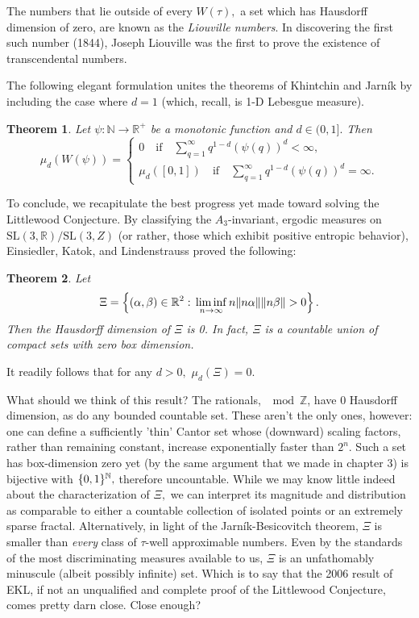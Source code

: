 \documentclass[12pt, letterpaper, oneside]{book}
\newcommand{\ga}{\ensuremath{\alpha}}
\newcommand{\gb}{\ensuremath{\beta}}
\newcommand{\gt}{\ensuremath{\tau}}
\newcommand{\R}{\mathbb{R}}
\newcommand{\N}{\mathbb{N}}
\newcommand{\Z}{\mathbb{Z}}
\DeclarePairedDelimiter{\norm}{\lVert}{\rVert}
\DeclarePairedDelimiter{\set}{\lbrace}{\rbrace}
\theoremstyle{plain}
\newtheorem{theorem}{Theorem}
\theoremstyle{definition}
\theoremstyle{remark}
\begin{document}
The numbers that lie outside of every $W(\gt),$ a set which has Hausdorff dimension of zero, are known as the \textit{Liouville numbers}. In discovering the first such number (1844), Joseph Liouville was the first to prove the existence of transcendental numbers.

The following elegant formulation unites the theorems of Khintchin and Jarn{\'i}k by including the case where $d = 1$ (which, recall, is 1-D Lebesgue measure). 

\begin{theorem}
Let $\psi: \N \to \R^+$ be a monotonic function and $d \in (0,1].$ Then
\[
\mu_d(W(\psi)) = 
\begin{cases}
0 \quad \mbox{if}\quad \sum_{q=1}^\infty q^{1-d}(\psi(q))^d < \infty,\\
\mu_d([0,1]) \quad \mbox{if} \quad \sum_{q=1}^\infty q^{1-d}(\psi(q))^d = \infty.
\end{cases}
\]
\end{theorem}

To conclude, we recapitulate the best progress yet made toward solving the Littlewood Conjecture. By classifying the $A_3$-invariant, ergodic measures on $\mbox{SL}(3,\R)/\mbox{SL}(3,Z)$ (or rather, those which exhibit positive entropic behavior), Einsiedler, Katok, and Lindenstrauss proved the following:

\begin{theorem}
Let 
\[
\Xi = \left \{ (\ga,\gb) \in \R^2:\,\liminf \limits_{n \to \infty} n\norm{n\ga}\norm{n\gb} > 0 \right \}.
\]
Then the Hausdorff dimension of $\Xi$ is 0. In fact, $\Xi$ is a countable union of compact sets with zero box dimension. 
\end{theorem}
It readily follows that for any $d > 0,$ $\mu_d(\Xi) = 0.$

What should we think of this result? The rationals, $\mod \Z$, have 0 Hausdorff dimension, as do any bounded countable set. These aren't the only ones, however: one can define a sufficiently 'thin' Cantor set whose (downward) scaling factors, rather than remaining constant, increase exponentially faster than $2^n.$ Such a set has box-dimension zero yet (by the same argument that we made in chapter 3) is bijective with $\set{0,1}^\N,$ therefore uncountable. While we may know little indeed about the characterization of $\Xi,$ we can interpret its magnitude and distribution as comparable to either a countable collection of isolated points or an extremely sparse fractal. Alternatively, in light of the Jarn{\'i}k-Besicovitch theorem, $\Xi$ is smaller than \textit{every} class of $\gt$-well approximable numbers. Even by the standards of the most discriminating measures available to us, $\Xi$ is an unfathomably minuscule (albeit possibly infinite) set. Which is to say that the 2006 result of EKL, if not an unqualified and complete proof of the Littlewood Conjecture, comes pretty darn close. Close enough?



\nocite{*}
\end{document}
